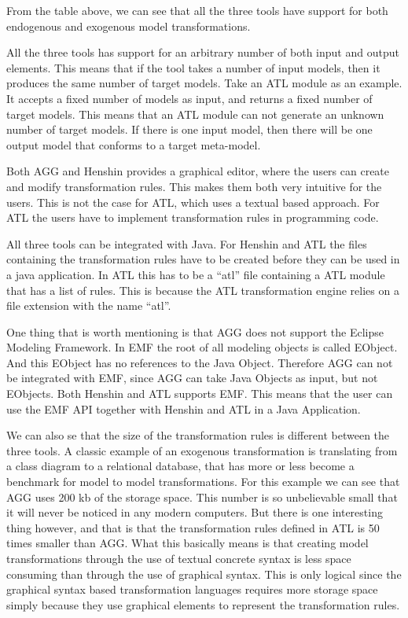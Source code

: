 From the table above, we can see that all the three tools have support
for both endogenous and exogenous model transformations. 

All the three tools has support for an arbitrary number of both input and
output elements. This means that if the tool takes a number of input models, then it
produces the same number of target models. Take an ATL module as an example. It
accepts a fixed number of models as input, and returns a fixed number of target
models. This means that an ATL module can not generate an unknown number of
target models. If there is one input model, then there will be one output model
that conforms to a target meta-model.

Both AGG and Henshin provides a graphical editor, where the users can create and
modify transformation rules. This makes them both very intuitive for the users.
This is not the case for ATL, which uses a textual based approach. For ATL the
users have to implement transformation rules in programming code.

All three tools can be integrated with Java. For Henshin and ATL the files
containing the transformation rules have to be created before they can be used
in a java application. In ATL this has to be a ``atl'' file containing a ATL
module that has a list of rules. This is because the ATL transformation engine
relies on a file extension with the name ``atl''.

One thing that is worth mentioning is that AGG does not support the Eclipse
Modeling Framework. In EMF the root of all modeling objects is called
EObject. And this EObject has no references to the Java Object. Therefore AGG
can not be integrated with EMF, since AGG can take Java Objects as input,
but not EObjects. Both Henshin and ATL supports EMF. This means that the user
can use the EMF API together with Henshin and ATL in a Java Application.

We can also se that the size of the transformation rules is different
between the three tools. A classic example of an exogenous transformation is
translating from a class diagram to a relational database, that has more or less become a
benchmark for model to model transformations. For this example we can see that
AGG uses 200 kb of the storage space. This number is so unbelievable small
that it will never be noticed in any modern computers. But there is one
interesting thing however, and that is that the transformation rules defined in
ATL is 50 times smaller than AGG. What this basically means is that creating model
transformations through the use of textual concrete syntax is less space
consuming than through the use of graphical syntax. This is only logical since
the graphical syntax based transformation languages requires more storage
space simply because they use graphical elements to represent the transformation
rules.

